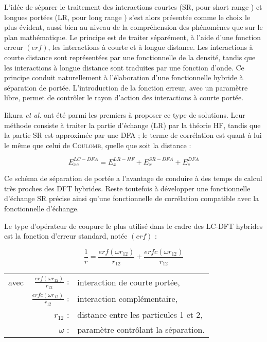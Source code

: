 \documentclass[12pt,a4paper]{book}
\begin{document}
	L'idée de séparer le traitement des interactions courtes (SR, pour \og short range \fg{}) et longues portées (LR, pour \og long range \fg{}) s'est alors présentée comme le choix le plus évident, aussi bien au niveau de la compréhension des phénomènes que sur le plan mathématique. Le principe est de traiter séparément, à l'aide d'une fonction erreur $(erf)$, les interactions à courte et à longue distance. Les interactions à courte distance sont représentées par une fonctionnelle de la densité, tandis que les interactions à longue distance sont traduites par une fonction d'onde. Ce principe conduit naturellement à l'élaboration d'une fonctionnelle hybride à séparation de portée. L'introduction de la fonction erreur, avec un paramètre libre, permet de contrôler le rayon d'action des interactions à courte portée.
	
	Iikura \textit{et al.} \cite{iikura2001long} ont été parmi les premiers à proposer ce type de solutions. Leur méthode consiste à traiter la partie d'échange (LR) par la théorie HF, tandis que la partie SR est approximée par une DFA ; le terme de corrélation est quant à lui le même que celui de \textsc{Coulomb}, quelle que soit la distance :
	
	\begin{equation}
	E_{xc}^{LC-DFA} = E_{x}^{LR-HF} + E_{x}^{SR-DFA} + E_{c}^{DFA}
	\end{equation}
	
	Ce schéma de séparation de portée a l'avantage de conduire à des temps de calcul très proches des DFT hybrides. Reste toutefois à développer une fonctionnelle d'échange SR précise ainsi qu'une fonctionnelle de corrélation compatible avec la fonctionnelle d'échange.
	
	Le type d'opérateur de coupure le plus utilisé dans le cadre des LC-DFT hybrides est la fonction d'erreur standard, notée $(erf)$ :
	
	\begin{equation}
	\frac{1}{r} = \frac{erf(\omega r_{12})}{r_{12}} + \frac{erfc(\omega r_{12})}{r_{12}}
	\label{erf}
	\end{equation}
	
	\begin{flushleft}
		\begin{tabular}{@{}lrp{10cm}}
			avec & $\frac{erf(\omega r_{12})}{r_{12}}$ : & interaction de courte portée, \\
			& $\frac{erfc(\omega r_{12})}{r_{12}}$ : & interaction complémentaire, \\
			& $r_{12}$ : & distance entre les particules 1 et 2, \\
			& $\omega$ : & paramètre contrôlant la séparation.
		\end{tabular}
	\end{flushleft}
	
\end{document}
